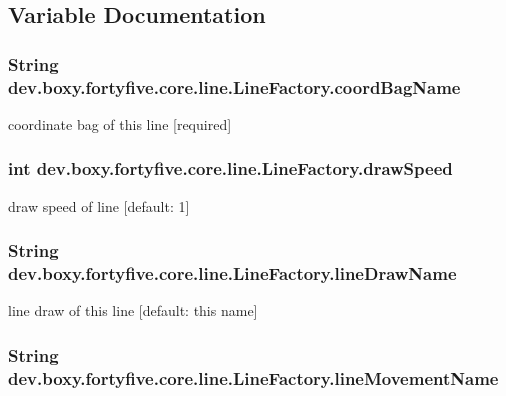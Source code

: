 \subsection{Variable Documentation}
\hypertarget{group__lines_ga969981925a8234168adae9c55eeb6a1a}{
\subsubsection[{coordBagName}]{\setlength{\rightskip}{0pt plus 5cm}String {\bf dev.boxy.fortyfive.core.line.LineFactory.coordBagName}}}
\label{db/df8/group__lines_ga969981925a8234168adae9c55eeb6a1a}
coordinate bag of this line \mbox{[}required\mbox{]} \hypertarget{group__lines_ga7bd2106bc26ec2589e14ed6e60f60c35}{
\subsubsection[{drawSpeed}]{\setlength{\rightskip}{0pt plus 5cm}int {\bf dev.boxy.fortyfive.core.line.LineFactory.drawSpeed}}}
\label{db/df8/group__lines_ga7bd2106bc26ec2589e14ed6e60f60c35}
draw speed of line \mbox{[}default: 1\mbox{]} \hypertarget{group__lines_ga08b877628c04bbe9a6996ad72ca0e999}{
\subsubsection[{lineDrawName}]{\setlength{\rightskip}{0pt plus 5cm}String {\bf dev.boxy.fortyfive.core.line.LineFactory.lineDrawName}}}
\label{db/df8/group__lines_ga08b877628c04bbe9a6996ad72ca0e999}
line draw of this line \mbox{[}default: this name\mbox{]} \hypertarget{group__lines_ga4b63112d92793b6d05a8a2c2a847ebd0}{
\subsubsection[{lineMovementName}]{\setlength{\rightskip}{0pt plus 5cm}String {\bf dev.boxy.fortyfive.core.line.LineFactory.lineMovementName}}}
